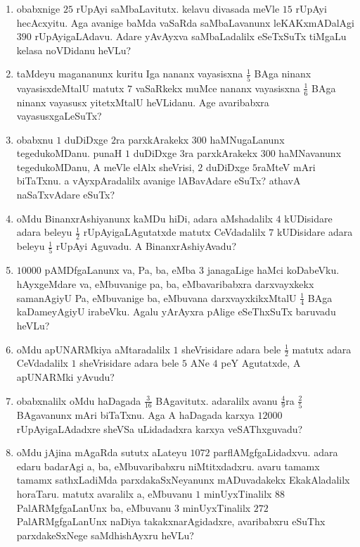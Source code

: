 \begin{enumerate}
\item obabxnige $25$ rUpAyi saMbaLavitutx. kelavu divasada meVle $15$
rUpAyi hecAcxyitu. Aga avanige baMda vaSaRda saMbaLavanunx
leKAKxmADalAgi $390$ rUpAyigaLAdavu. Adare yAvAyxva saMbaLadalilx
eSeTxSuTx tiMgaLu kelasa noVDidanu heVLu?

\item taMdeyu magananunx kuritu Iga nananx vayasisxna $\frac{1}{5}$
BAga ninanx vayasisxdeMtalU matutx $7$ vaSaRkekx muMce nananx
vayasisxna $\frac{1}{6}$ BAga ninanx vayasusx yitetxMtalU
heVLidanu. Age avaribabxra vayasusxgaLeSuTx?

\item obabxnu $1$ duDiDxge $2$ra parxkArakekx $300$ haMNugaLanunx
tegedukoMDanu. punaH $1$ duDiDxge $3$ra parxkArakekx $300$ haMNavanunx
tegedukoMDanu, A meVle elAlx sheVrisi, $2$ duDiDxge $5$raMteV mAri
biTaTxnu. a vAyxpAradalilx avanige lABavAdare eSuTx? athavA
naSaTxvAdare eSuTx?

\item oMdu BinanxrAshiyanunx kaMDu hiDi, adara aMshadalilx $4$
kUDisidare adara beleyu $\frac{1}{2}$ rUpAyigaLAgutatxde matutx
CeVdadalilx $7$ kUDisidare adara beleyu $\frac{1}{5}$ rUpAyi
Aguvadu. A BinanxrAshiyAvadu?

\item $10000$ pAMDfgaLanunx va, Pa, ba, eMba $3$ janagaLige haMci
koDabeVku. hAyxgeMdare va, eMbuvanige pa, ba, eMbavaribabxra
darxvayxkekx samanAgiyU Pa, eMbuvanige ba, eMbuvana
darxvayxkikxMtalU $\frac{1}{4}$ BAga kaDameyAgiyU irabeVku. Agalu
yArAyxra pAlige eSeThxSuTx baruvadu heVLu?

\item oMdu apUNARMkiya aMtaradalilx $1$ sheVrisidare adara bele
$\frac{1}{2}$ matutx adara CeVdadalilx $1$ sheVrisidare adara bele $5$
ANe $4$ peY Agutatxde, A apUNARMki yAvudu?

\item obabxnalilx oMdu haDagada $\frac{3}{16}$ BAgavitutx. adaralilx
avanu $\frac{4}{9}$ra $\frac{2}{5}$ BAgavanunx mAri biTaTxnu. Aga A
haDagada karxya $12000$ rUpAyigaLAdadxre sheVSa uLidadadxra karxya
veSAThxguvadu? 

\item oMdu jAjina mAgaRda sututx aLateyu $1072$
parflAMgfgaLidadxvu. adara edaru badarAgi a, ba, eMbuvaribabxru
niMtitxdadxru. avaru tamamx tamamx sathxLadiMda parxdakaSxNeyanunx
mADuvadakekx EkakAladalilx horaTaru. matutx avaralilx a, eMbuvanu $1$
minUyxTinalilx $88$ PalARMgfgaLanUnx ba, eMbuvanu $3$ minUyxTinalilx
$272$ PalARMgfgaLanUnx naDiya takakxnarAgidadxre, avaribabxru eSuThx
parxdakeSxNege saMdhishAyxru heVLu?


\end{enumerate}
